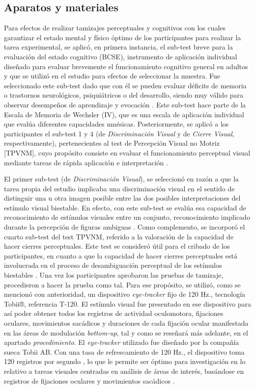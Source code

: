 \documentclass[spanish]{textolivre}
\begin{document}
\subsection{Aparatos y materiales}\label{sec-fmt-manuscrito}
Para efectos de realizar tamizajes perceptuales y cognitivos con los cuales garantizar el estado mental y físico óptimo de los participantes para realizar la tarea experimental, se aplicó, en primera instancia, el sub-test breve para la evaluación del estado cognitivo (BCSE), instrumento de aplicación individual diseñado para evaluar brevemente el funcionamiento cognitivo general en adultos y que se utilizó en el estudio para efectos de seleccionar la muestra. Fue seleccionado este sub-test dado que con él se pueden evaluar déficits de memoria o trastornos neurológicos, psiquiátricos o del desarrollo, siendo muy válido para observar desempeños de aprendizaje y evocación \cite{chirivella_test_2003}. Este sub-test hace parte de la Escala de Memoria de Wechsler (IV), que es una escala de aplicación individual que evalúa diferentes capacidades mnésicas. Posteriormente, se aplicó a los participantes el sub-test 1 y 4 (de \textit{Discriminación Visual} y de \textit{Cierre Visual}, respectivamente), pertenecientes al test de Percepción Visual no Motriz [TPVNM], cuyo propósito consiste en evaluar el funcionamiento perceptual visual mediante tareas de rápida aplicación e interpretación \cite{merino_test_2008}.

El primer sub-test (de \textit{Discriminación Visual}), se seleccionó en razón a que la tarea propia del estudio implicaba una discriminación visual en el sentido de distinguir una u otra imagen posible entre las dos posibles interpretaciones del estímulo visual biestable. En efecto, con este sub-test se evalúa esa capacidad de reconocimiento de estímulos visuales entre un conjunto, reconocimiento implicado durante la percepción de figuras ambiguas \cite{rock_why_1994}. Como complemento, se incorporó el cuarto sub-test del test TPVNM, referido a la valoración de la capacidad de hacer cierres perceptuales. Este test se consideró útil para el cribado de los participantes, en cuanto a que la capacidad de hacer cierres perceptuales está involucrada en el proceso de desambiguación perceptual de los estímulos biestables \cite{pressnitzer_temporal_2006}. Una vez los participantes aprobaron las pruebas de tamizaje, procedieron a hacer la prueba como tal. Para ese propósito, se utilizó, como se mencionó con anterioridad, un dispositivo \textit{eye-tracker} fijo de 120 Hz., tecnología Tobii®, referencia T-120. El estímulo visual fue presentado en ese dispositivo para así poder obtener todos los registros de actividad oculomotora, fijaciones oculares, movimientos sacádicos y duraciones de cada fijación ocular manifestada en las áreas de modulación \textit{bottom-up}, tal y como se reseñará más adelante, en el apartado \textit{procedimiento}. El \textit{eye-tracker} utilizado fue diseñado por la compañía sueca Tobii AB. Con una tasa de refrescamiento de 120 Hz., el dispositivo toma 120 registros por segundo \cite{tobii_ab_user_2012}, lo que le permite ser óptimo para investigación en lo relativo a tareas visuales centradas en análisis de áreas de interés, basándose en registros de fijaciones oculares y movimientos sacádicos \cite{hahn_eye_2022}.
\end{document}
